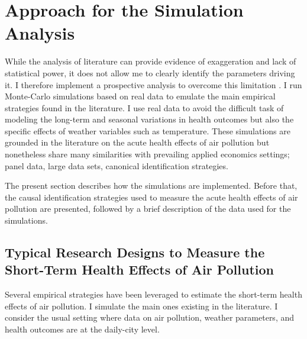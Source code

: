 \documentclass[12pt]{article}
\begin{document}



\section{Approach for the Simulation Analysis}\label{section_simulations}

    While the analysis of literature can provide evidence of exaggeration and lack of statistical power, it does not allow me to clearly identify the parameters driving it. I therefore implement a prospective analysis to overcome this limitation \citep[for other examples of power simulations]{altoe_enhancing_2020, black_simulated_2022}. I run Monte-Carlo simulations based on real data to emulate the main empirical strategies found in the literature. I use real data to avoid the difficult task of modeling the long-term and seasonal variations in health outcomes but also the specific effects of weather variables such as temperature. These simulations are grounded in the literature on the acute health effects of air pollution but nonetheless share many similarities with prevailing applied economics settings; panel data, large data sets, canonical identification strategies.

    The present section describes how the simulations are implemented. Before that, the causal identification strategies used to measure the acute health effects of air pollution are presented, followed by a brief description of the data used for the simulations.
        
    \subsection{Typical Research Designs to Measure the Short-Term Health Effects of Air Pollution}
        
        Several empirical strategies have been leveraged to estimate the short-term health effects of air pollution. I simulate the main ones existing in the literature. I consider the usual setting where data on air pollution, weather parameters, and health outcomes are at the daily-city level.
        
\end{document}
